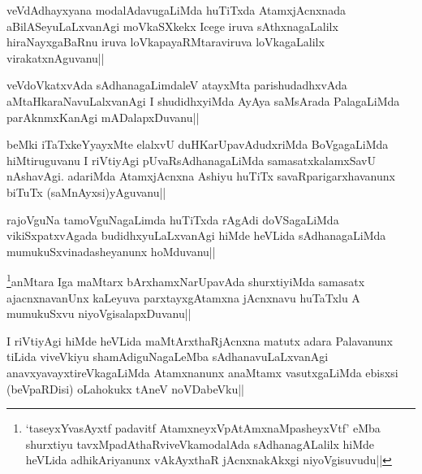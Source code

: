 \begin{artha}
veVdAdhayxyana modalAdavugaLiMda huTiTxda AtamxjAcnxnada aBilASeyuLaLxvanAgi moVkaSXkekx Icege iruva sAthxnagaLalilx hiraNayxgaBaRnu iruva loVkapayaRMtaraviruva loVkagaLalilx virakatxnAguvanu||
\end{artha}


\begin{artha}
veVdoVkatxvAda sAdhanagaLimdaleV atayxMta parishudadhxvAda aMtaHkaraNavuLalxvanAgi I shudidhxyiMda AyAya saMsArada PalagaLiMda parAknmxKanAgi mADalapxDuvanu||
\end{artha}


\begin{artha}
beMki iTaTxkeYyayxMte elalxvU duHKarUpavAdudxriMda BoVgagaLiMda hiMtiruguvanu I riVtiyAgi pUvaRsAdhanagaLiMda samasatxkalamxSavU nAshavAgi. adariMda AtamxjAcnxna Ashiyu huTiTx savaRparigarxhavanunx biTuTx (saMnAyxsi)yAguvanu||
\end{artha}


\begin{artha}
rajoVguNa tamoVguNagaLimda huTiTxda rAgAdi doVSagaLiMda vikiSxpatxvAgada budidhxyuLaLxvanAgi hiMde heVLida sAdhanagaLiMda mumukuSxvinadasheyanunx hoMduvanu||
\end{artha}


\begin{artha}
\footnote{`taseyxYvasAyxtf padavitf AtamxneyxVpA\s\s tAmxnaMpasheyxVtf' eMba shurxtiyu tavxMpadAthaRviveVkamodalAda sAdhanagALalilx hiMde heVLida adhikAriyanunx vAkAyxthaR jAcnxnakAkxgi niyoVgisuvudu||}anMtara Iga maMtarx bArxhamxNarUpavAda shurxtiyiMda samasatx ajacnxnavanUnx kaLeyuva parxtayxgAtamxna jAcnxnavu huTaTxlu A mumukuSxvu niyoVgisalapxDuvanu||
\end{artha}


\begin{artha}
I riVtiyAgi hiMde heVLida maMtArxthaRjAcnxna matutx adara Palavanunx tiLida viveVkiyu shamAdiguNagaLeMba sAdhanavuLaLxvanAgi anavxyavayxtireVkagaLiMda Atamxnanunx anaMtamx vasutxgaLiMda ebisxsi (beVpaRDisi) oLahokukx tAneV noVDabeVku||
\end{artha}

